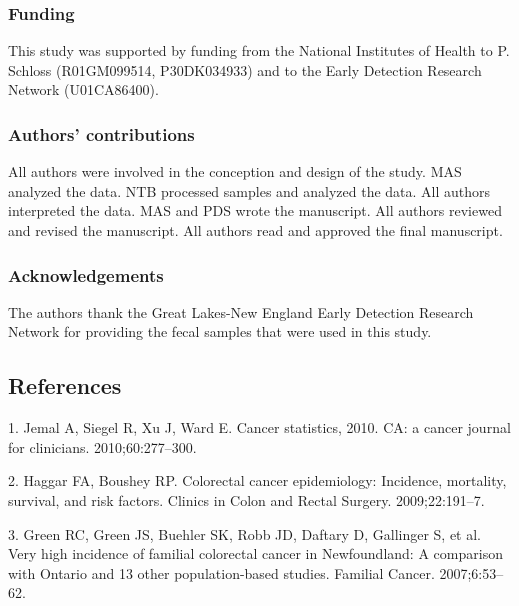 \documentclass[12pt,]{article}
\begin{document}
\subsubsection{Funding}\label{funding}

This study was supported by funding from the National Institutes of
Health to P. Schloss (R01GM099514, P30DK034933) and to the Early
Detection Research Network (U01CA86400).

\subsubsection{Authors' contributions}\label{authors-contributions}

All authors were involved in the conception and design of the study. MAS
analyzed the data. NTB processed samples and analyzed the data. All
authors interpreted the data. MAS and PDS wrote the manuscript. All
authors reviewed and revised the manuscript. All authors read and
approved the final manuscript.

\subsubsection{Acknowledgements}\label{acknowledgements}

The authors thank the Great Lakes-New England Early Detection Research
Network for providing the fecal samples that were used in this study.

\newpage

\subsection*{References}\label{references}

\hypertarget{refs}{}
\hypertarget{ref-jemal_cancer_2010}{}
1. Jemal A, Siegel R, Xu J, Ward E. Cancer statistics, 2010. CA: a
cancer journal for clinicians. 2010;60:277--300.

\hypertarget{ref-haggar_colorectal_2009}{}
2. Haggar FA, Boushey RP. Colorectal cancer epidemiology: Incidence,
mortality, survival, and risk factors. Clinics in Colon and Rectal
Surgery. 2009;22:191--7.

\hypertarget{ref-green_very_2007}{}
3. Green RC, Green JS, Buehler SK, Robb JD, Daftary D, Gallinger S, et
al. Very high incidence of familial colorectal cancer in Newfoundland: A
comparison with Ontario and 13 other population-based studies. Familial
Cancer. 2007;6:53--62.
\end{document}
